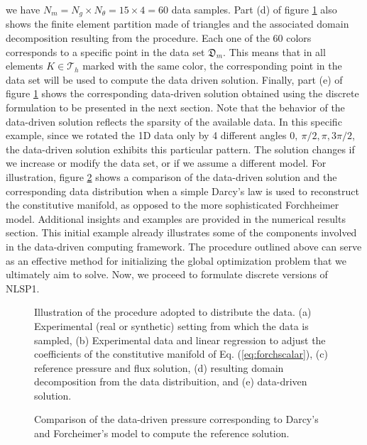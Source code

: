 we have $N_m = N_g \times N_{\theta} = 15 \times 4 = 60$ data samples.
Part (d) of figure \ref{fig:datadistproc} also shows the finite element
partition made of triangles and the associated domain decomposition
resulting from the procedure.
Each one of the $60$ colors corresponds to a specific point in the data
set $\mathfrak{D}_m$. This means that in all elements $K \in \mathcal{T}_h$ marked with
the same color, the corresponding point in the data set will be used to compute
the data driven solution. Finally, part (e) of figure \ref{fig:datadistproc} shows
the corresponding data-driven solution obtained using the discrete formulation 
to be presented in the next section. Note that the behavior
of the data-driven solution reflects the sparsity of the available data.
In this specific example, since we rotated the 1D data only by 4 different
angles $0,~\pi/2, \pi, 3\pi/2$, the data-driven solution exhibits this particular pattern.
The solution changes if we increase or modify the data set, or if we assume a different model. For illustration, figure \ref{fig:compadarcyfor} shows a comparison of the data-driven solution and the corresponding data distribution when a simple Darcy's law is used to reconstruct the constitutive manifold, as opposed to the more sophisticated Forchheimer model. Additional insights and examples are provided in the numerical results section. This initial example already illustrates some of the components 
involved in the data-driven computing framework. 
The procedure outlined above can serve as an effective method for initializing
the global optimization problem that we ultimately aim to solve. 
Now, we proceed to formulate discrete versions of NLSP1.

\begin{figure}[ht!!]
  \begin{center}
  \caption{Illustration of the procedure adopted to distribute the data.
    (a) Experimental (real or synthetic) setting from which the data is sampled,
    (b) Experimental data and linear regression to adjust
    the coefficients of the constitutive manifold of Eq. (\ref{eq:forchscalar}),
    (c) reference pressure and flux solution, (d) resulting domain decomposition
    from the data distribuition, and (e) data-driven solution.} \label{fig:datadistproc}
  \fontsize{5pt}{6pt} \selectfont
  \def\svgwidth{13cm}
  
  \end{center}
\end{figure}

\begin{figure}[ht!!]
	\begin{center}
		\caption{Comparison of the data-driven pressure 
			corresponding to Darcy's and Forcheimer's model to
			compute the reference solution.} \label{fig:compadarcyfor}
		\fontsize{5pt}{6pt} \selectfont
		\def\svgwidth{13cm}
		
	\end{center}
\end{figure}

